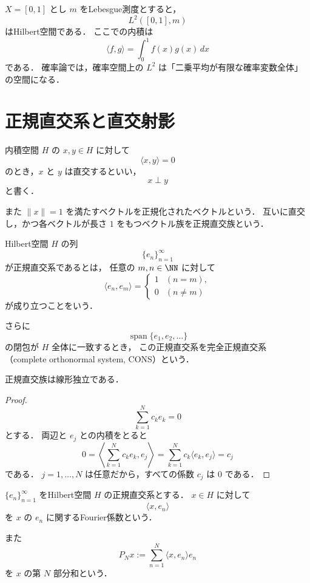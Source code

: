 \begin{example}
$X=[0,1]$ とし $m$ をLebesgue測度とすると，
\[
L^2([0,1],m)
\]
はHilbert空間である．
ここでの内積は
\[
\langle f,g\rangle=\int_0^1 f(x)g(x)\,dx
\]
である．
確率論では，確率空間上の $L^2$ は「二乗平均が有限な確率変数全体」の空間になる．
\end{example}

\section{正規直交系と直交射影}

\begin{definition}[直交と正規直交]
内積空間 $H$ の $x,y\in H$ に対して
\[
\langle x,y\rangle=0
\]
のとき，$x$ と $y$ は直交するといい，
\[
x\perp y
\]
と書く．

また $\|x\|=1$ を満たすベクトルを正規化されたベクトルという．
互いに直交し，かつ各ベクトルが長さ $1$ をもつベクトル族を正規直交族という．
\end{definition}

\begin{definition}[正規直交系とCONS]
Hilbert空間 $H$ の列
\[
\{e_n\}_{n=1}^{\infty}
\]
が正規直交系であるとは，
任意の $m,n\in\NN$ に対して
\[
\langle e_n,e_m\rangle=
\begin{cases}
1 & (n=m),\\
0 & (n\ne m)
\end{cases}
\]
が成り立つことをいう．

さらに
\[
\operatorname{span}\{e_1,e_2,\dots\}
\]
の閉包が $H$ 全体に一致するとき，
この正規直交系を完全正規直交系
（complete orthonormal system, CONS）という．
\end{definition}

\begin{proposition}
正規直交族は線形独立である．
\end{proposition}
\begin{proof}
\[
\sum_{k=1}^N c_k e_k=0
\]
とする．
両辺と $e_j$ との内積をとると
\[
0
=
\left\langle \sum_{k=1}^N c_k e_k,e_j\right\rangle
=
\sum_{k=1}^N c_k \langle e_k,e_j\rangle
=
c_j
\]
である．
$j=1,\dots,N$ は任意だから，すべての係数 $c_j$ は $0$ である．
\end{proof}

\begin{definition}[Fourier係数と部分和]
$\{e_n\}_{n=1}^{\infty}$ をHilbert空間 $H$ の正規直交系とする．
$x\in H$ に対して
\[
\langle x,e_n\rangle
\]
を $x$ の $e_n$ に関するFourier係数という．

また
\[
P_Nx:=\sum_{n=1}^N \langle x,e_n\rangle e_n
\]
を $x$ の第 $N$ 部分和という．
\end{definition}

